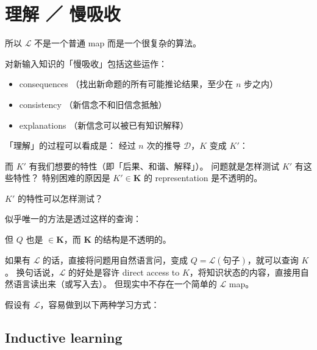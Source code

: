 \documentclass[12pt]{article}
\begin{document}
\section{理解 ／ 慢吸收}

所以 $\mathcal{L}$ 不是一个普通 map 而是一个很复杂的算法。

对新输入知识的「慢吸收」包括这些运作：
\begin{itemize}
\item consequences （找出新命题的所有可能推论结果，至少在 $n$ 步之内）
\item consistency （新信念不和旧信念抵触）
\item explanations （新信念可以被已有知识解释）
\end{itemize}

「理解」的过程可以看成是： 经过 $n$ 次的推导 $\mathcal{D}$，$K$ 变成 $K'$：
\begin{center}
\end{center}
而 $K'$ 有我们想要的特性（即「后果、和谐、解释」）。  问题就是怎样测试 $K'$ 有这些特性？  特别困难的原因是 $K' \in \mathbf{K}$ 的 representation 是不透明的。

$K'$ 的特性可以怎样测试？

似乎唯一的方法是透过这样的查询：
\begin{center}
\end{center}
但 $Q$ 也是 $\in \mathbf{K}$，而 $\mathbf{K}$ 的结构是不透明的。

如果有 $\mathcal{L}$ 的话，直接将问题用自然语言问，变成 $Q = \mathcal{L}(\mbox{句子})$，就可以查询 $K$。 换句话说，$\mathcal{L}$ 的好处是容许 direct access to $K$，将知识状态的内容，直接用自然语言读出来（或写入去）。 但现实中不存在一个简单的 $\mathcal{L}$ map。



假设有 $\mathcal{L}$，容易做到以下两种学习方式：

\subsection{Inductive learning}
\end{document}
